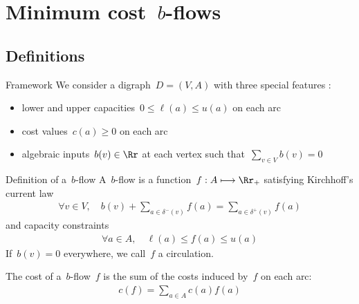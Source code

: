\documentclass{beamer}
\begin{document}
\begin{frame}
\end{frame}




\section{Minimum cost~$b$-flows}

\subsection{Definitions}

\begin{frame}[t]{Framework}  \pause
We consider a digraph~$D = (V, A)$ with three special features : \pause
\begin{itemize}
  \item lower and upper capacities~$0 \leq \ell(a) \leq u(a)$ on each arc \pause
  \item cost values~$c(a) \geq 0$ on each arc \pause
  \item algebraic inputs~$b(v) \in \Rr$ at each vertex such that~$\sum_{v \in V} b(v) = 0$
\end{itemize}
\end{frame}

\begin{frame}[t]{Definition of a~$b$-flow} \pause
  A~$b$-flow is a function~$f: A \longmapsto \Rr_+$ satisfying Kirchhoff's current law
  \begin{align*}
    \forall v \in V, \quad b(v) + \sum_{a \in \delta^-(v)} f(a) = \sum_{a \in \delta^+(v)} f(a)
  \end{align*} \pause
  and capacity constraints
  \begin{align*}
    \forall a \in A, \quad \ell(a) \leq f(a) \leq u(a)
  \end{align*} \pause
  If~$b(v) = 0$ everywhere, we call~$f$ a circulation.
  
  \medskip \pause
  
  The cost of a~$b$-flow~$f$ is the sum of the costs induced by~$f$ on each arc:
  \begin{align*}
    c(f) = \sum_{a \in A} c(a) f(a)
  \end{align*}
\end{frame}
\end{document}
